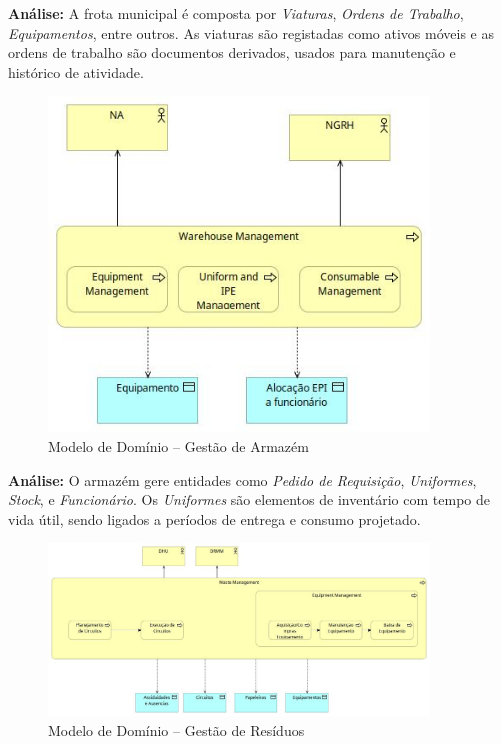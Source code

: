 \documentclass[12pt,a4paper,final]{article}
\begin{document}
    \textbf{Análise:} A frota municipal é composta por \textit{Viaturas}, \textit{Ordens de Trabalho}, \textit{Equipamentos}, entre outros. As viaturas são registadas como ativos móveis e as ordens de trabalho são documentos derivados, usados para manutenção e histórico de atividade.

    \begin{figure}[H]
        \centering
        \includegraphics[width=0.9\textwidth]{Q8 - Domain Model For Information Entities - Warehouse Management.jpg}
        \caption{Modelo de Domínio – Gestão de Armazém}
        \label{fig:q8-armazem}
    \end{figure}

    \textbf{Análise:} O armazém gere entidades como \textit{Pedido de Requisição}, \textit{Uniformes}, \textit{Stock}, e \textit{Funcionário}. Os \textit{Uniformes} são elementos de inventário com tempo de vida útil, sendo ligados a períodos de entrega e consumo projetado.

    \begin{figure}[H]
        \centering
        \includegraphics[width=0.9\textwidth]{Q8 - Domain Model For Information Entities - Waste Management.jpg}
        \caption{Modelo de Domínio – Gestão de Resíduos}
        \label{fig:q8-residuos}
    \end{figure}
\end{document}
